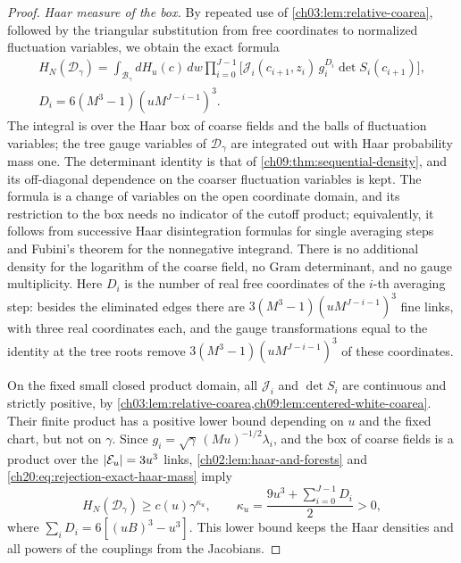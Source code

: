 \begin{proof}
\emph{Haar measure of the box.} By repeated use of \cref{ch03:lem:relative-coarea}, followed by the triangular substitution from free coordinates to normalized fluctuation variables, we obtain the exact formula
\begin{equation}\label{ch20:eq:rejection-exact-haar-mass}
 \begin{gathered}
 H_N(\mathcal D_\gamma)=\int_{\mathcal B_\gamma}dH_u(c)\,dw\prod_{i=0}^{J-1}\bigl[\mathcal J_i(c_{i+1},z_i)\,g_i^{D_i}\det S_i(c_{i+1})\bigr],\\
 D_i=6(M^3-1)(uM^{J-i-1})^3.
 \end{gathered}
\end{equation}
The integral is over the Haar box of coarse fields and the balls of fluctuation variables; the tree gauge variables of $\mathcal D_\gamma$ are integrated out with Haar probability mass one. The determinant identity is that of \cref{ch09:thm:sequential-density}, and its off-diagonal dependence on the coarser fluctuation variables is kept. The formula is a change of variables on the open coordinate domain, and its restriction to the box needs no indicator of the cutoff product; equivalently, it follows from successive Haar disintegration formulas for single averaging steps and Fubini's theorem for the nonnegative integrand. There is no additional density for the logarithm of the coarse field, no Gram determinant, and no gauge multiplicity. Here $D_i$ is the number of real free coordinates of the $i$-th averaging step: besides the eliminated edges there are $3(M^3-1)(uM^{J-i-1})^3$ fine links, with three real coordinates each, and the gauge transformations equal to the identity at the tree roots remove $3(M^3-1)(uM^{J-i-1})^3$ of these coordinates.

On the fixed small closed product domain, all $\mathcal J_i$ and $\det S_i$ are continuous and strictly positive, by \cref{ch03:lem:relative-coarea,ch09:lem:centered-white-coarea}. Their finite product has a positive lower bound depending on $u$ and the fixed chart, but not on $\gamma$. Since $g_i=\sqrt\gamma\,(Mu)^{-1/2}\lambda_i$, and the box of coarse fields is a product over the $\lvert \mathcal E_{u}\rvert=3u^3$ links, \cref{ch02:lem:haar-and-forests} and \eqref{ch20:eq:rejection-exact-haar-mass} imply
\begin{equation}\label{ch20:eq:rejection-box-mass-lower}
 H_N(\mathcal D_\gamma)\ge c(u)\gamma^{\kappa_u},\qquad \kappa_u=\frac{9u^3+\sum_{i=0}^{J-1}D_i}{2}>0,
\end{equation}
where $\sum_iD_i=6[(uB)^3-u^3]$. This lower bound keeps the Haar densities and all powers of the couplings from the Jacobians.


\end{proof}
